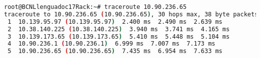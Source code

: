 \begin{lstlisting}[language=bash, caption={External node BCNLlenguadoc17Rack route to the LEDE-MESH2 internal Client.}]
root@BCNLlenguadoc17Rack:~# traceroute 10.90.236.65
traceroute to 10.90.236.65 (10.90.236.65), 30 hops max, 38 byte packets
 1  10.139.95.97 (10.139.95.97)  2.400 ms  2.490 ms  2.639 ms
 2  10.38.140.225 (10.38.140.225)  3.940 ms  3.741 ms  4.165 ms
 3  10.139.173.65 (10.139.173.65)  5.410 ms  5.448 ms  5.104 ms
 4  10.90.236.1 (10.90.236.1)  6.999 ms  7.007 ms  7.173 ms
 5  10.90.236.65 (10.90.236.65)  7.435 ms  6.954 ms  7.633 ms
\end{lstlisting}
